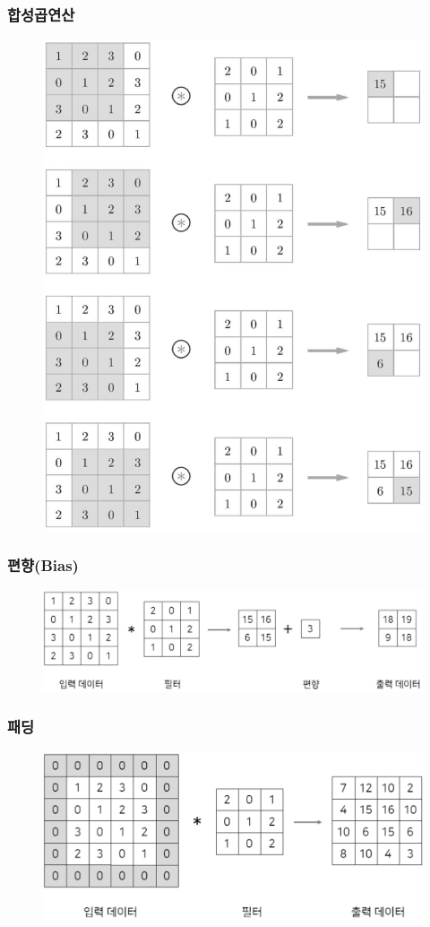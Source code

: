 \documentclass{beamer}
\begin{document}
\begin{frame}
	\frametitle{합성곱연산}
	\begin{figure}
		\includegraphics[width=0.45\columnwidth]{../Figure/Figure_3.pdf}
	\end{figure}
\end{frame}

\begin{frame}
	\frametitle{편향(Bias)}
	\begin{figure}
		\includegraphics[width=1\columnwidth]{../Figure/Figure_4.pdf}
	\end{figure}
\end{frame}
\begin{frame}
	\frametitle{패딩}
	\begin{figure}
		\includegraphics[width=1\columnwidth]{../Figure/Figure_5.pdf}
	\end{figure}
\end{frame}
\end{document}
